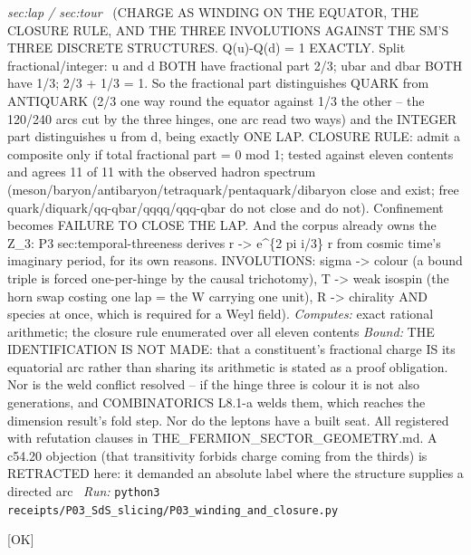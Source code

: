 \begin{description}
\textit{sec:lap / sec:tour} \ (CHARGE AS WINDING ON THE EQUATOR, THE CLOSURE RULE, AND THE THREE INVOLUTIONS AGAINST THE SM'S THREE DISCRETE STRUCTURES. Q(u)-Q(d) = 1 EXACTLY. Split fractional/integer: u and d BOTH have fractional part 2/3; ubar and dbar BOTH have 1/3; 2/3 + 1/3 = 1. So the fractional part distinguishes QUARK from ANTIQUARK (2/3 one way round the equator against 1/3 the other -- the 120/240 arcs cut by the three hinges, one arc read two ways) and the INTEGER part distinguishes u from d, being exactly ONE LAP. CLOSURE RULE: admit a composite only if total fractional part = 0 mod 1; tested against eleven contents and agrees 11 of 11 with the observed hadron spectrum (meson/baryon/antibaryon/tetraquark/pentaquark/dibaryon close and exist; free quark/diquark/qq-qbar/qqqq/qqq-qbar do not close and do not). Confinement becomes FAILURE TO CLOSE THE LAP. And the corpus already owns the Z\_3: P3 sec:temporal-threeness derives r -> e\textasciicircum{}\{2 pi i/3\} r from cosmic time's imaginary period, for its own reasons. INVOLUTIONS: sigma -> colour (a bound triple is forced one-per-hinge by the causal trichotomy), T -> weak isospin (the horn swap costing one lap = the W carrying one unit), R -> chirality AND species at once, which is required for a Weyl field). 
\emph{Computes:} exact rational arithmetic; the closure rule enumerated over all eleven contents
 \emph{Bound:} THE IDENTIFICATION IS NOT MADE: that a constituent's fractional charge IS its equatorial arc rather than sharing its arithmetic is stated as a proof obligation. Nor is the weld conflict resolved -- if the hinge three is colour it is not also generations, and COMBINATORICS L8.1-a welds them, which reaches the dimension result's fold step. Nor do the leptons have a built seat. All registered with refutation clauses in THE\_FERMION\_SECTOR\_GEOMETRY.md. A c54.20 objection (that transitivity forbids charge coming from the thirds) is RETRACTED here: it demanded an absolute label where the structure supplies a directed arc
\ \emph{Run:} \texttt{python3 receipts/P03\_SdS\_slicing/P03\_winding\_and\_closure.py}
\item[\label{rcpt:P03_twelve_null_legs}\texttt{P03\_twelve\_null\_legs}]\hfill\textsf{[OK]}\\

\end{description}
